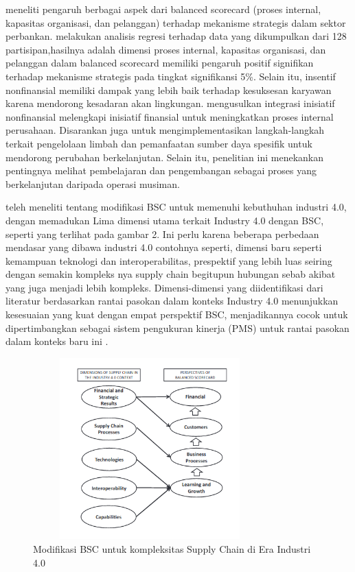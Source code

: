 \documentclass{article}
\begin{document}
\cite{Ali2021TheBS} meneliti pengaruh berbagai aspek dari balanced scorecard (proses internal, kapasitas organisasi, dan pelanggan) terhadap mekanisme strategis dalam sektor perbankan. \cite{Ali2021TheBS} melakukan analisis regresi terhadap data yang dikumpulkan dari 128 partisipan,hasilnya adalah dimensi proses internal, kapasitas organisasi, dan pelanggan dalam balanced scorecard memiliki pengaruh positif signifikan terhadap mekanisme strategis pada tingkat signifikansi 5\%. Selain itu, insentif nonfinansial memiliki dampak yang lebih baik terhadap kesuksesan karyawan karena mendorong kesadaran akan lingkungan. \cite{Ali2021TheBS} mengusulkan integrasi inisiatif nonfinansial melengkapi inisiatif finansial untuk meningkatkan proses internal perusahaan. Disarankan juga untuk mengimplementasikan langkah-langkah terkait pengelolaan limbah dan pemanfaatan sumber daya spesifik untuk mendorong perubahan berkelanjutan. Selain itu, penelitian ini menekankan pentingnya melihat pembelajaran dan pengembangan sebagai proses yang berkelanjutan daripada operasi musiman.

\cite{Frederico2020PerformanceMF} teleh meneliti tentang modifikasi BSC untuk memenuhi kebuthuhan industri 4.0, dengan memadukan Lima dimensi utama terkait Industry 4.0 dengan BSC, seperti yang terlihat pada gambar 2. Ini perlu karena  beberapa perbedaan mendasar yang dibawa industri 4.0 contohnya seperti, dimensi baru seperti kemampuan teknologi dan interoperabilitas, prespektif yang lebih luas seiring dengan semakin kompleks nya supply chain begitupun  hubungan sebab akibat yang juga menjadi lebih kompleks.  Dimensi-dimensi yang diidentifikasi dari literatur berdasarkan rantai pasokan dalam konteks Industry 4.0 menunjukkan kesesuaian yang kuat dengan empat perspektif BSC, menjadikannya cocok untuk dipertimbangkan sebagai sistem pengukuran kinerja (PMS) untuk rantai pasokan dalam konteks baru ini \cite{Frederico2020PerformanceMF}.
\begin{figure}[htbp]
    \centering
    \includegraphics[width=0.8\textwidth,height=7cm]{Industry-4}
    \caption{Modifikasi BSC untuk kompleksitas Supply Chain di Era Industri 4.0}
\end{figure}
\end{document}
